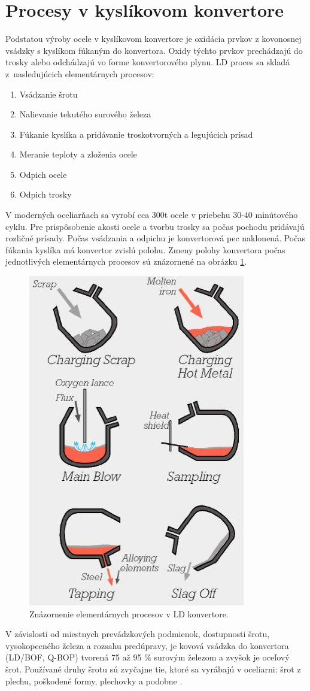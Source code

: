 \documentclass[]{tukediphc}
\begin{document}
\section{Procesy v kyslíkovom konvertore}

Podstatou výroby ocele v kyslíkovom konvertore je oxidácia prvkov z kovonosnej vsádzky s kyslíkom fúkaným do konvertora. Oxidy týchto prvkov prechádzajú do trosky alebo odchádzajú vo forme konvertorového plynu. LD proces sa skladá z~nasledujúcich elementárnych procesov:

\begin{enumerate}
	\item Vsádzanie šrotu
	\item Nalievanie tekutého surového železa
	\item Fúkanie kyslíka a pridávanie troskotvorných a legujúcich prísad
	\item Meranie teploty a zloženia ocele
	\item Odpich ocele
	\item Odpich trosky
\end{enumerate}

V moderných oceliarňach sa vyrobí cca 300t ocele v priebehu 30-40 minútového cyklu. Pre prispôsobenie akosti ocele a tvorbu trosky sa počas pochodu pridávajú rozličné prísady. Počas vsádzania a odpichu je konvertorová pec naklonená. Počas fúkania kyslíka má konvertor zvislú polohu. Zmeny polohy konvertora počas jednotlivých elementárnych procesov sú znázornené na obrázku \ref{o:30}.

\begin{figure}[h!]
	\centering
	\includegraphics[width=.35\textwidth,angle=0]{convertor-phases.jpg}
	\caption{Znázornenie elementárnych procesov v LD konvertore.}
	\label{o:30}
\end{figure}

V závislosti od miestnych prevádzkových podmienok, dostupnosti šrotu, vysokopecného železa a rozsahu predúpravy, je kovová vsádzka do konvertora (LD/BOF, Q-BOP) tvorená 75 až 95 \% surovým železom a zvyšok je oceľový šrot. Používané druhy šrotu sú zvyčajne tie, ktoré sa vyrábajú v oceliarni: šrot z plechu, poškodené formy, plechovky a podobne \cite{Turkdogan1996}.
\end{document}
